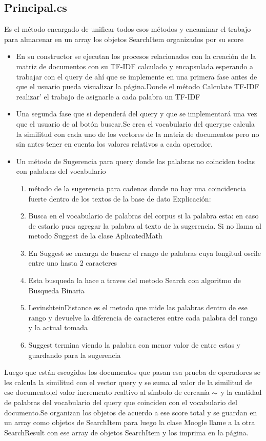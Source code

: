 \documentclass[a4paper,12pt]{article}
\begin{document}
\subsection{Principal.cs}
Es el método encargado de unificar todos esos  métodos y encaminar el trabajo
para almacenar en un array los objetos SearchItem organizados por su score
\begin{itemize}
    \item En su  constructor se ejecutan los procesos relacionados con la creación de la
    matriz de documentos con su TF-IDF calculado y encapsulada esperando a
    trabajar con el query  de ahí que se implemente en una primera fase antes de
    que el usuario pueda visualizar la página.Donde el método Calculate TF-IDF
    realizar\a' el trabajo  de asignarle a cada palabra un TF-IDF
    \item Una segunda fase que si dependerá del query y que se implementará una vez
    que el usuario de al botón buscar.Se crea el vocabulario del query;se  calcula la
    similitud con cada  uno de los vectores de la matriz de documentos pero no sin
    antes tener en  cuenta los valores relativos a cada operador.
    \item Un m\'etodo de Sugerencia para query donde las palabras no coinciden todas con palabras del 
    vocabulario
    \begin{enumerate}
        \item m\'etodo de la sugerencia para cadenas donde no hay una coincidencia fuerte dentro de los textos de la base de dato
        Explicaci\'on:
    
    \item  Busca en el vocabulario de palabras del corpus si la palabra esta: en caso de estarlo pues
    agregar la palabra al texto de la sugerencia. Si no llama al metodo Suggest de la clase AplicatedMath
    \item  En Suggest se encarga de buscar el rango de palabras cuya longitud oscile entre uno hasta 2 caracteres
    \item Esta busqueda la hace a traves del metodo Search con algoritmo de Busqueda Binaria
    \item  LevinshteinDistance es el metodo que mide las palabras dentro de ese rango y devuelve la diferencia de
    caracteres entre cada palabra del rango y la actual tomada
    \item  Suggest termina viendo la palabra con menor valor de entre estas y guardando para la sugerencia
    \end{enumerate}
    
\end{itemize}
Luego que  están  escogidos los documentos que pasan esa prueba de
operadores se les calcula la similitud con  el vector query y se suma al valor de
la similitud de ese documento,el valor incremento realtivo al símbolo de
cercanía $\thicksim$  y la cantidad de palabras del vocabulario del query que coinciden
con el vocabulario del documento.Se organizan los objetos de acuerdo a ese
score total y se guardan en un array como objetos de SearchItem para luego la
clase Moogle llame  a la otra SearchResult con ese array de objetos SearchItem
y los imprima en la página. 
\end{document}

